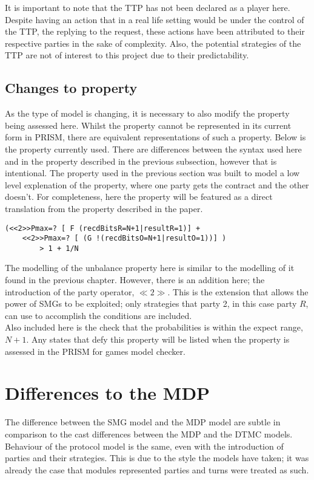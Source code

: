 \documentclass{l4proj}
\begin{document}
It is important to note that the TTP has not been declared as a player here. Despite having an action that in a real life setting would be under the control of the TTP, the replying to the request, these actions have been attributed to their respective parties in the sake of complexity. Also, the potential strategies of the TTP are not of interest to this project due to their predictability.

\subsection{Changes to property}

As the type of model is changing, it is necessary to also modify the property being assessed here. Whilst the property cannot be represented in its current form in PRISM, there are equivalent representations of such a property. Below is the property currently used. There are differences between the syntax used here and in the property described in the previous subsection, however that is intentional. The property used in the previous section was built to model a low level explenation of the property, where one party gets the contract and the other doesn't. For completeness, here the property will be featured as a direct translation from the property described in the paper. 

\begin{lstlisting}
(<<2>>Pmax=? [ F (recdBitsR=N+1|resultR=1)] + 
    <<2>>Pmax=? [ (G !(recdBitsO=N+1|resultO=1))] ) 
        > 1 + 1/N
\end{lstlisting}

The modelling of the unbalance property here is similar to the modelling of it found in the previous chapter. However, there is an addition here; the introduction of the party operator, $\ll 2 \gg$. This is the extension that allows the power of SMGs to be exploited; only strategies that party 2, in this case party $R$, can use to accomplish the conditions are included. \\
Also included here is the check that the probabilities is within the expect range, $N+1$. Any states that defy this property will be listed when the property is assessed in the PRISM for games model checker.

\section{Differences to the MDP}

The difference between the SMG model and the MDP model are subtle in comparison to the cast differences between the MDP and the DTMC models. Behaviour of the protocol model is the same, even with the introduction of parties and their strategies. This is due to the style the models have taken; it was already the case that modules represented parties and turns were treated as such. 
\end{document}
